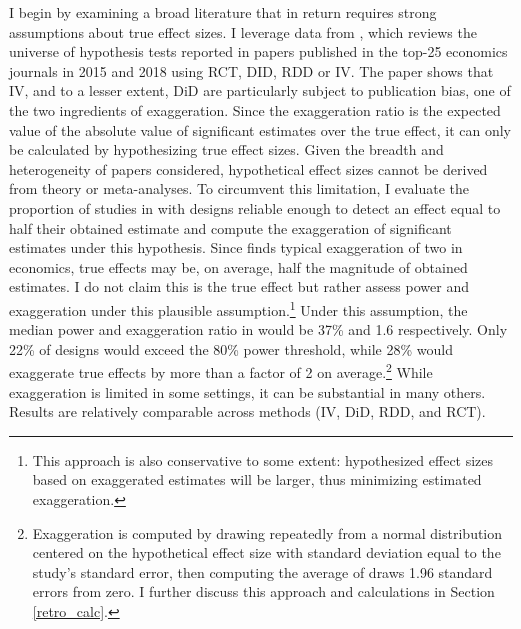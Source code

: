 \documentclass[usletter, 12pt]{article}
\begin{document}
			I begin by examining a broad literature that in return requires strong assumptions about true effect sizes. I leverage data from \cite{brodeur_methods_2020}, which reviews the universe of hypothesis tests reported in papers published in the top-25 economics journals in 2015 and 2018 using RCT, DID, RDD or IV. The paper shows that IV, and to a lesser extent, DiD are particularly subject to publication bias, one of the two ingredients of exaggeration. Since the exaggeration ratio is the expected value of the absolute value of significant estimates over the true effect, it can only be calculated by hypothesizing true effect sizes. Given the breadth and heterogeneity of papers considered, hypothetical effect sizes cannot be derived from theory or meta-analyses. To circumvent this limitation, I evaluate the proportion of studies in \cite{brodeur_methods_2020} with designs reliable enough to detect an effect equal to half their obtained estimate and compute the exaggeration of significant estimates under this hypothesis. Since \cite{ioannidis_power_2017} finds typical exaggeration of two in economics, true effects may be, on average, half the magnitude of obtained estimates. I do not claim this is the true effect but rather assess power and exaggeration under this plausible assumption.\footnote{This approach is also conservative to some extent: hypothesized effect sizes based on exaggerated estimates will be larger, thus minimizing estimated exaggeration.} 
			Under this assumption, the median power and exaggeration ratio in \cite{brodeur_methods_2020} would be 37\% and 1.6 respectively. Only 22\% of designs would exceed the 80\% power threshold, while 28\% would exaggerate true effects by more than a factor of 2 on average.\footnote{Exaggeration is computed by drawing repeatedly from a normal distribution centered on the hypothetical effect size with standard deviation equal to the study's standard error, then computing the average of draws 1.96 standard errors from zero. I further discuss this approach and calculations in Section \ref{retro_calc}.} While exaggeration is limited in some settings, it can be substantial in many others. Results are relatively comparable across methods (IV, DiD, RDD, and RCT).
			 
\end{document}
